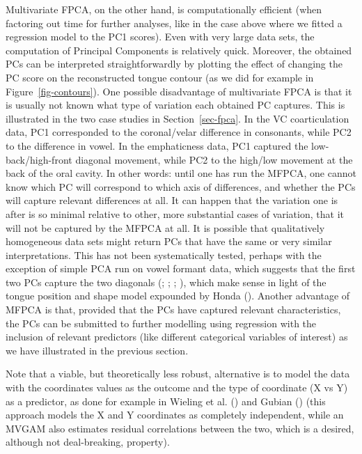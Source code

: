\documentclass[
  man,
  longtable,
  nolmodern,
  notxfonts,
  notimes,
  colorlinks=true,linkcolor=blue,citecolor=blue,urlcolor=blue]{apa7}
\begin{document}
Multivariate FPCA, on the other hand, is computationally efficient (when
factoring out time for further analyses, like in the case above where we
fitted a regression model to the PC1 scores). Even with very large data
sets, the computation of Principal Components is relatively quick.
Moreover, the obtained PCs can be interpreted straightforwardly by
plotting the effect of changing the PC score on the reconstructed tongue
contour (as we did for example in Figure~\ref{fig-contours}). One
possible disadvantage of multivariate FPCA is that it is usually not
known what type of variation each obtained PC captures. This is
illustrated in the two case studies in Section~\ref{sec-fpca}. In the VC
coarticulation data, PC1 corresponded to the coronal/velar difference in
consonants, while PC2 to the difference in vowel. In the emphaticness
data, PC1 captured the low-back/high-front diagonal movement, while PC2
to the high/low movement at the back of the oral cavity. In other words:
until one has run the MFPCA, one cannot know which PC will correspond to
which axis of differences, and whether the PCs will capture relevant
differences at all. It can happen that the variation one is after is so
minimal relative to other, more substantial cases of variation, that it
will not be captured by the MFPCA at all. It is possible that
qualitatively homogeneous data sets might return PCs that have the same
or very similar interpretations. This has not been systematically
tested, perhaps with the exception of simple PCA run on vowel formant
data, which suggests that the first two PCs capture the two diagonals
(;
;
;
), which make
sense in light of the tongue position and shape model expounded by Honda
(). Another advantage of MFPCA is that,
provided that the PCs have captured relevant characteristics, the PCs
can be submitted to further modelling using regression with the
inclusion of relevant predictors (like different categorical variables
of interest) as we have illustrated in the previous section.

Note that a viable, but theoretically less robust, alternative is to
model the data with the coordinates values as the outcome and the type
of coordinate (X vs Y) as a predictor, as done for example in Wieling et
al. () and Gubian
() (this approach models the X and Y
coordinates as completely independent, while an MVGAM also estimates
residual correlations between the two, which is a desired, although not
deal-breaking, property).
\end{document}
